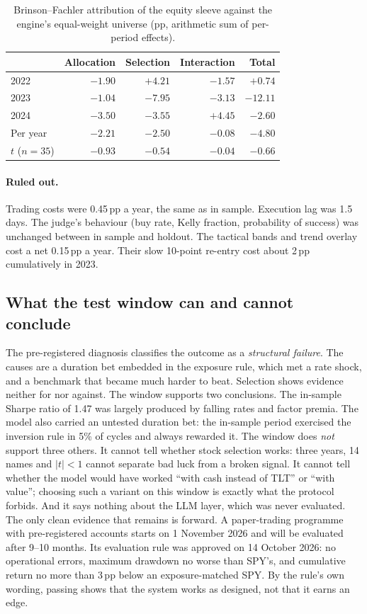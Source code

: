\documentclass[11pt]{article}
\begin{document}
\begin{table}[t]
\centering
\caption{Brinson--Fachler attribution of the equity sleeve against the engine's equal-weight universe (pp, arithmetic sum of per-period effects).}
\label{tab:brinson}
\small
\begin{tabular}{lrrrr}
\toprule
 & Allocation & Selection & Interaction & Total \\
\midrule
2022 & $-1.90$ & $+4.21$ & $-1.57$ & $+0.74$ \\
2023 & $-1.04$ & $-7.95$ & $-3.13$ & $-12.11$ \\
2024 & $-3.50$ & $-3.55$ & $+4.45$ & $-2.60$ \\
\midrule
Per year & $-2.21$ & $-2.50$ & $-0.08$ & $-4.80$ \\
$t$ ($n=35$) & $-0.93$ & $-0.54$ & $-0.04$ & $-0.66$ \\
\bottomrule
\end{tabular}
\end{table}

\paragraph{Ruled out.} Trading costs were 0.45\,pp a year, the same as in sample. Execution lag was 1.5 days. The judge's behaviour (buy rate, Kelly fraction, probability of success) was unchanged between in sample and holdout. The tactical bands and trend overlay cost a net 0.15\,pp a year. Their slow 10-point re-entry cost about 2\,pp cumulatively in 2023.

\subsection{What the test window can and cannot conclude}

The pre-registered diagnosis classifies the outcome as a \emph{structural failure}. The causes are a duration bet embedded in the exposure rule, which met a rate shock, and a benchmark that became much harder to beat. Selection shows evidence neither for nor against. The window supports two conclusions. The in-sample Sharpe ratio of 1.47 was largely produced by falling rates and factor premia. The model also carried an untested duration bet: the in-sample period exercised the inversion rule in 5\% of cycles and always rewarded it. The window does \emph{not} support three others. It cannot tell whether stock selection works: three years, 14 names and $|t|<1$ cannot separate bad luck from a broken signal. It cannot tell whether the model would have worked ``with cash instead of TLT'' or ``with value''; choosing such a variant on this window is exactly what the protocol forbids. And it says nothing about the LLM layer, which was never evaluated. The only clean evidence that remains is forward. A paper-trading programme with pre-registered accounts starts on 1 November 2026 and will be evaluated after 9--10 months. Its evaluation rule was approved on 14 October 2026: no operational errors, maximum drawdown no worse than SPY's, and cumulative return no more than 3\,pp below an exposure-matched SPY. By the rule's own wording, passing shows that the system works as designed, not that it earns an edge.
\end{document}
